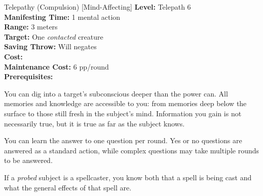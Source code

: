 {Telepathy (Compulsion) [Mind-Affecting]}
{
	\textbf{Level:}
	Telepath 6\\
	\textbf{Manifesting Time:}
	1 mental action\\
	\textbf{Range:}
	3 meters\\
	\textbf{Target:}
	One \emph{contacted} creature\\
	\textbf{Saving Throw:}
	Will negates\\
	\textbf{Cost:}
	\\
	\textbf{Maintenance Cost:}
	6 pp/round\\
	\textbf{Prerequisites:}
	\\
}
{
	You can dig into a target's subconscious deeper than the  power can. All memories and knowledge are accessible to you: from memories deep below the surface to those still fresh in the subject's mind. Information you gain is not necessarily true, but it is true as far as the subject knows.

	You can learn the answer to one question per round. Yes or no questions are answered as a standard action, while complex questions may take multiple rounds to be answered.

	If a \emph{probed} subject is a spellcaster, you know both that a spell is being cast and what the general effects of that spell are.
}
